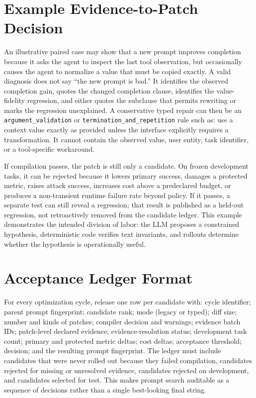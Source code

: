 \documentclass[10pt]{article}
\begin{document}
\section{Example Evidence-to-Patch Decision}
An illustrative paired case may show that a new prompt improves completion because it asks the agent to inspect the last tool observation, but occasionally causes the agent to normalize a value that must be copied exactly. A valid diagnosis does not say ``the new prompt is bad.'' It identifies the observed completion gain, quotes the changed completion clause, identifies the value-fidelity regression, and either quotes the subclause that permits rewriting or marks the regression unexplained. A conservative typed repair can then be an \texttt{argument\_validation} or \texttt{termination\_and\_repetition} rule such as: use a context value exactly as provided unless the interface explicitly requires a transformation. It cannot contain the observed value, user entity, task identifier, or a tool-specific workaround.

If compilation passes, the patch is still only a candidate. On frozen development tasks, it can be rejected because it lowers primary success, damages a protected metric, raises attack success, increases cost above a predeclared budget, or produces a non-transient runtime failure rate beyond policy. If it passes, a separate test can still reveal a regression; that result is published as a held-out regression, not retroactively removed from the candidate ledger. This example demonstrates the intended division of labor: the LLM proposes a constrained hypothesis, deterministic code verifies text invariants, and rollouts determine whether the hypothesis is operationally useful.

\section{Acceptance Ledger Format}
For every optimization cycle, release one row per candidate with: cycle identifier; parent prompt fingerprint; candidate rank; mode (legacy or typed); diff size; number and kinds of patches; compiler decision and warnings; evidence batch IDs; patch-level declared evidence; evidence-resolution status; development task count; primary and protected metric deltas; cost deltas; acceptance threshold; decision; and the resulting prompt fingerprint. The ledger must include candidates that were never rolled out because they failed compilation, candidates rejected for missing or unresolved evidence, candidates rejected on development, and candidates selected for test. This makes prompt search auditable as a sequence of decisions rather than a single best-looking final string.
\end{document}
